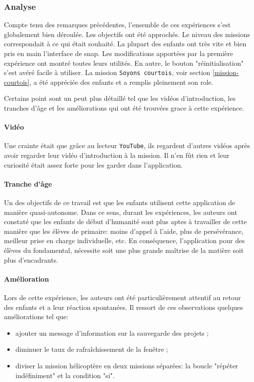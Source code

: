\subsubsection{Analyse}
\label{analyse-scienceinfuse}
Compte tenu des remarques précédentes, l'ensemble de ces expériences s'est globalement bien déroulée. Les objectifs ont été approchés. Le niveau des missions correspondait à ce qui était souhaité. La plupart des enfants ont très vite et bien pris en main l'interface de \gls{snap}. Les modifications apportées par la première expérience ont montré toutes leurs utilités. En autre, le bouton "réinitialisation" s'est avéré facile à utiliser. La mission \texttt{Soyons courtois}, voir section \ref{mission-courtois}, a été appréciée des enfants et a remplis pleinement son \gls{role}.

Certains point sont un peut plus détaillé tel que les vidéos d'introduction, les tranches d'âge et les améliorations qui ont été trouvées grace à cette expérience.

\paragraph{Vidéo}
Une crainte était que grâce au lecteur \texttt{YouTube}, ils regardent d'autres vidéos après avoir regarder leur vidéo d'introduction à la mission. Il n'en fût rien et leur curiosité était assez forte pour les garder dans l'application.

\paragraph{Tranche d'âge}
\label{trancheage}
Un des objectifs de ce travail est que les enfants utilisent cette application de manière quasi-autonome. Dans ce sens, durant les expériences, les auteurs ont constaté que les enfants de début d'humanité sont plus aptes à travailler de cette manière que les élèves de primaire: moins d'appel à l'aide, plus de persévérance, meilleur prise en charge individuelle, etc.
En conséquence, l'application pour des élèves du fondamental, nécessite soit une plus grande maîtrise de la matière soit plus d'encadrants.

\paragraph{Amélioration}
Lors de cette expérience, les auteurs ont été particulièrement attentif au retour des enfants et a leur réaction spontanées. Il ressort de ces observations quelques améliorations tel que:
\begin{itemize}
  \item ajouter un message d'information sur la sauvegarde des projets ;
  \item diminuer le taux de rafraîchissement de la fenêtre ;
  \item diviser la mission hélicoptère en deux missions séparées: la boucle "répéter indéfiniment" et la condition "si".
\end{itemize}

